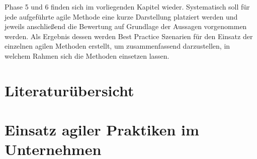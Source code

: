 Phase 5 und 6 finden sich im vorliegenden Kapitel wieder. Systematisch soll für jede aufgeführte agile Methode eine kurze Darstellung platziert werden und jeweils anschließend die Bewertung auf Grundlage der Aussagen vorgenommen werden. Als Ergebnis dessen werden Best Practice Szenarien für den Einsatz der einzelnen agilen Methoden erstellt, um zusammenfassend darzustellen, in welchem Rahmen sich die Methoden einsetzen lassen.


\section{Literaturübersicht}



\todots

\section{Einsatz agiler Praktiken im Unternehmen}



